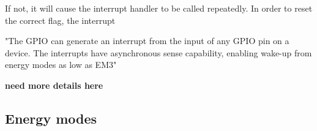 If not, it will cause the interrupt handler to be called repeatedly. In order to reset the correct flag, the interrupt 





"The GPIO can generate an interrupt from the input of any GPIO pin on a device. The interrupts have asynchronous sense capability, enabling wake-up from energy modes as low as EM3" 




{\bf need more details here}






\subsection{Energy modes}\label{ch:energy_modes} 
















